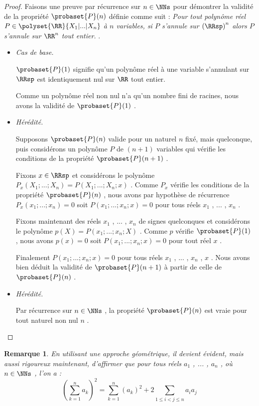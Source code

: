 \documentclass[12pt]{amsart}
\newtheorem*{remark*}{Remarque}
\begin{document}
\begin{proof}
	Faisons une preuve par récurrence sur $n \in \NNs$ pour démontrer la validité de la propriété $\probaset{P}(n)$ définie comme suit :
	\emph{\og 
		Pour tout polynôme réel $P \in \polyset{\RR}{X_1 | ... | X_n}$ à $n$ variables,
		si $P$ s'annule sur $\left( \RRsp \right)^n$ alors $P$ s'annule sur $\RR^n$ tout entier. 
	\fg}.

	\begin{itemize}[label=\small\textbullet]
		\item \emph{Cas de base.}
	
		\noindent
		$\probaset{P}(1)$ signifie qu'un polynôme réel à une variable s'annulant sur $\RRsp$ est identiquement nul sur $\RR$ tout entier.
		
		\smallskip
		\noindent
		Comme un polynôme réel non nul n'a qu'un nombre fini de racines, nous avons la validité de $\probaset{P}(1)$ .


		\medskip
		\item \emph{Hérédité.}
	
		\noindent
		Supposons $\probaset{P}(n)$ valide pour un naturel $n$ fixé, mais quelconque, puis considérons un polynôme $P$ de $(n + 1)$ variables qui vérifie les conditions de la propriété $\probaset{P}(n + 1)$ .
	
		\smallskip
		\noindent
		Fixons $x \in \RRsp$ et considérons le polynôme $P_x(X_1 ; ... ; X_n) = P(X_1 ; ... ; X_n ; x)$ .
		Comme $P_x$  vérifie les conditions de la propriété $\probaset{P}(n)$ ,
		nous avons par hypothèse de récurrence 
		$P_x(x_1 ; ... ; x_n) = 0$ soit $P(x_1 ; ... ; x_n ; x) = 0$ pour tous réels $x_1$ , ... , $x_n$ .
	
		\smallskip
		\noindent
		Fixons maintenant des réels $x_1$ , ... , $x_n$ de signes quelconques et considérons le polynôme $p(X) = P(x_1 ; ... ; x_n ; X)$ .
		Comme $p$ vérifie $\probaset{P}(1)$ , nous avons $p(x) = 0$ soit $P(x_1 ; ... ; x_n ; x) = 0$ pour tout réel $x$ .
	
		\smallskip
		\noindent
		Finalement $P(x_1 ; ... ; x_n ; x) = 0$ pour tous réels $x_1$ , ... , $x_n$ , $x$ .
		Nous avons bien déduit la validité de $\probaset{P}(n+1)$ à partir de celle de $\probaset{P}(n)$ .


	\medskip
	\item \emph{Hérédité.}
	
	\smallskip
	\noindent
	Par récurrence sur $n \in \NNs$ , la propriété $\probaset{P}(n)$ est vraie pour tout naturel non nul $n$ .
	\end{itemize} 

\end{proof}




\begin{remark*}
	En utilisant une approche géométrique, il devient évident, mais aussi rigoureux maintenant, d'affirmer que pour tous réels $a_1$ , ... , $a_n$ , où $n \in \NNs$ , l'on a :
\[
	\left( \sum_{k=1}^{n}a_k \right)^2
	=
	\sum_{k=1}^{n} \left( a_k \right)^2
	+
	2 \sum_{1 \leq i < j \leq n} a_i a_j
\]
\end{remark*}
\end{document}
